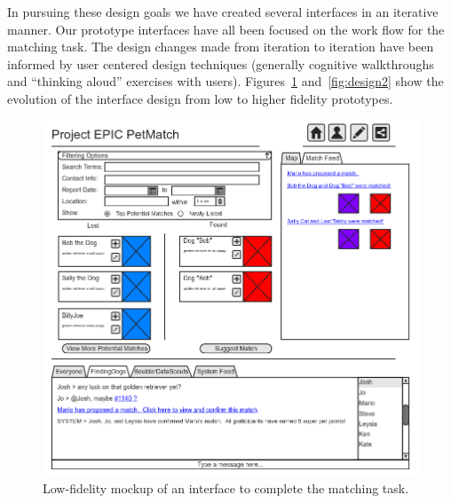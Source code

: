 In pursuing these design goals we have created several interfaces in an iterative manner.  Our prototype interfaces have all been focused on the work flow for the matching task.  The design changes made from iteration to iteration have been informed by user centered design techniques (generally cognitive walkthroughs and ``thinking aloud'' exercises with users).  Figures~\ref{fig:design1} and~\ref{fig:design2} show the evolution of the interface design from low to higher fidelity prototypes.

\begin{figure}[htbp]
    \begin{center}
	\includegraphics[width=150mm]{figs/design1.png}
    \end{center}
        \caption[First Interface Prototype]{
        Low-fidelity mockup of an interface to complete the matching task.
	}
	 \label{fig:design1}
\end{figure}

